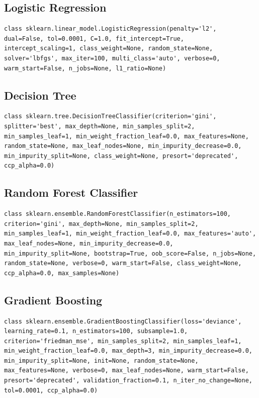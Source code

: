 \documentclass[12pt]{article}
\begin{document}
\subsection{Logistic Regression}
\begin{lstlisting}
class sklearn.linear_model.LogisticRegression(penalty='l2', dual=False, tol=0.0001, C=1.0, fit_intercept=True, intercept_scaling=1, class_weight=None, random_state=None, solver='lbfgs', max_iter=100, multi_class='auto', verbose=0, warm_start=False, n_jobs=None, l1_ratio=None)
\end{lstlisting}

\subsection{Decision Tree}
\begin{lstlisting}
class sklearn.tree.DecisionTreeClassifier(criterion='gini', splitter='best', max_depth=None, min_samples_split=2, min_samples_leaf=1, min_weight_fraction_leaf=0.0, max_features=None, random_state=None, max_leaf_nodes=None, min_impurity_decrease=0.0, min_impurity_split=None, class_weight=None, presort='deprecated', ccp_alpha=0.0)
\end{lstlisting}

\subsection{Random Forest Classifier}
\begin{lstlisting}
class sklearn.ensemble.RandomForestClassifier(n_estimators=100, criterion='gini', max_depth=None, min_samples_split=2, min_samples_leaf=1, min_weight_fraction_leaf=0.0, max_features='auto', max_leaf_nodes=None, min_impurity_decrease=0.0, min_impurity_split=None, bootstrap=True, oob_score=False, n_jobs=None, random_state=None, verbose=0, warm_start=False, class_weight=None, ccp_alpha=0.0, max_samples=None)
\end{lstlisting}

\subsection{Gradient Boosting}
\begin{lstlisting}
class sklearn.ensemble.GradientBoostingClassifier(loss='deviance', learning_rate=0.1, n_estimators=100, subsample=1.0, criterion='friedman_mse', min_samples_split=2, min_samples_leaf=1, min_weight_fraction_leaf=0.0, max_depth=3, min_impurity_decrease=0.0, min_impurity_split=None, init=None, random_state=None, max_features=None, verbose=0, max_leaf_nodes=None, warm_start=False, presort='deprecated', validation_fraction=0.1, n_iter_no_change=None, tol=0.0001, ccp_alpha=0.0)
\end{lstlisting}
\end{document}
